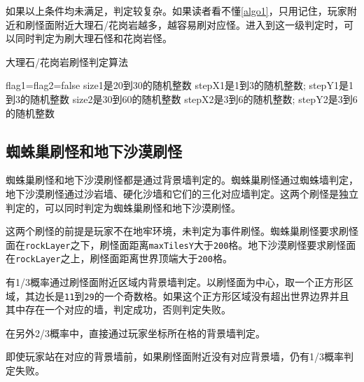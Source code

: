 如果以上条件均未满足，判定较复杂。如果读者看不懂\autoref{algo1}，只用记住，玩家附近和刷怪面附近大理石/花岗岩越多，越容易刷对应怪。进入到这一级判定时，可以同时判定为刷大理石怪和花岗岩怪。

\begin{algorithm}[!ht]
\caption{大理石/花岗岩刷怪判定算法}\label{algo1}
flag1=flag2=false\;
size1是20到30的随机整数\; 
stepX1是1到3的随机整数; stepY1是1到3的随机整数\;
size2是30到60的随机整数\; 
stepX2是3到6的随机整数; stepY2是3到6的随机整数\;
\end{algorithm}

\subsection{蜘蛛巢刷怪和地下沙漠刷怪}
蜘蛛巢刷怪和地下沙漠刷怪都是通过背景墙判定的。蜘蛛巢刷怪通过蜘蛛墙判定，地下沙漠刷怪通过沙岩墙、硬化沙墙和它们的三化对应墙判定。这两个刷怪是独立判定的，可以同时判定为蜘蛛巢刷怪和地下沙漠刷怪。

这两个刷怪的前提是玩家不在地牢环境，未判定为事件刷怪。蜘蛛巢刷怪要求刷怪面在\lstinline{rockLayer}之下，刷怪面距离\lstinline{maxTilesY}大于\lstinline{200}格。地下沙漠刷怪要求刷怪面在\lstinline{rockLayer}之上，刷怪面距离世界顶端大于\lstinline{200}格。

有1/3概率通过刷怪面附近区域内背景墙判定。以刷怪面为中心，取一个正方形区域，其边长是\lstinline{11}到\lstinline{29}的一个奇数格。如果这个正方形区域没有超出世界边界并且其中存在一个对应的墙，判定成功，否则判定失败。

在另外2/3概率中，直接通过玩家坐标所在格的背景墙判定。

\begin{remark}
即使玩家站在对应的背景墙前，如果刷怪面附近没有对应背景墙，仍有1/3概率判定失败。
\end{remark}

